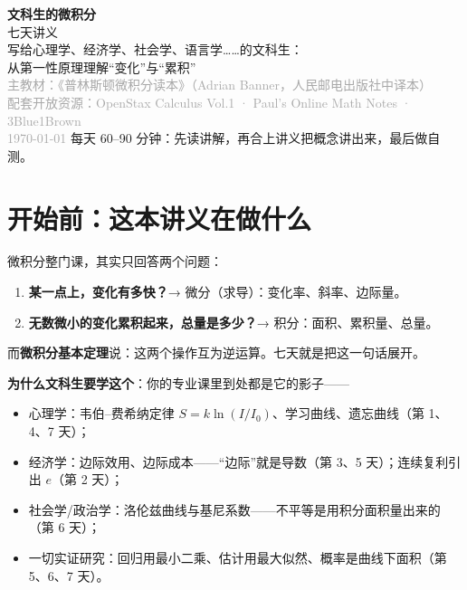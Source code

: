 \documentclass[UTF8,a4paper,11pt]{ctexart}
\begin{document}
\begin{center}
  \vspace*{1.8cm}
  {\Huge\bfseries\color{accent} 文科生的微积分}\\[0.4cm]
  {\LARGE 七天讲义}\\[1.1cm]
  {\large 写给心理学、经济学、社会学、语言学……的文科生：\\
   从第一性原理理解“变化”与“累积”}\\[0.6cm]
  {\small\textcolor{darkgray}{主教材：《普林斯顿微积分读本》（Adrian Banner，人民邮电出版社中译本）}}\\[0.2cm]
  {\small\textcolor{darkgray}{配套开放资源：OpenStax Calculus Vol.1 · Paul's Online Math Notes · 3Blue1Brown}}\\[0.3cm]
  {\small\textcolor{darkgray}{\today}}
  \vfill
  {\small 每天 60–90 分钟：先读讲解，再合上讲义把概念讲出来，最后做自测。}
\end{center}
\newpage

\tableofcontents
\newpage

\section*{开始前：这本讲义在做什么}

微积分整门课，其实只回答两个问题：

\begin{enumerate}
  \item \textbf{某一点上，变化有多快？}→ 微分（求导）：变化率、斜率、边际量。
  \item \textbf{无数微小的变化累积起来，总量是多少？}→ 积分：面积、累积量、总量。
\end{enumerate}

而\textbf{微积分基本定理}说：这两个操作互为逆运算。七天就是把这一句话展开。

\textbf{为什么文科生要学这个}：你的专业课里到处都是它的影子——

\begin{itemize}
  \item 心理学：韦伯–费希纳定律 $S=k\ln(I/I_0)$、学习曲线、遗忘曲线（第 1、4、7 天）；
  \item 经济学：边际效用、边际成本——“边际”就是导数（第 3、5 天）；连续复利引出 $e$（第 2 天）；
  \item 社会学/政治学：洛伦兹曲线与基尼系数——不平等是用积分面积量出来的（第 6 天）；
  \item 一切实证研究：回归用最小二乘、估计用最大似然、概率是曲线下面积（第 5、6、7 天）。
\end{itemize}
\end{document}
